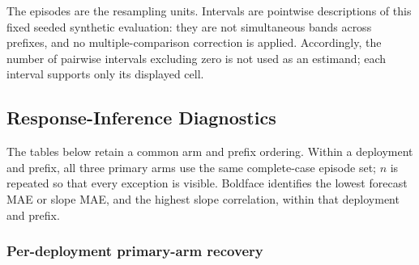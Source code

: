 The episodes are the resampling units. Intervals are pointwise descriptions of
this fixed seeded synthetic evaluation: they are not simultaneous bands across
prefixes, and no multiple-comparison correction is applied. Accordingly, the
number of pairwise intervals excluding zero is not used as an estimand; each
interval supports only its displayed cell.

\subsection{Response-Inference Diagnostics}
\label{app:coin-city-results}

The tables below retain a common arm and prefix ordering. Within a deployment and
prefix, all three primary arms use the same complete-case episode set; \(n\) is
repeated so that every exception is visible. Boldface identifies the lowest
forecast MAE or slope MAE, and the highest slope correlation, within that
deployment and prefix.

\subsubsection{Per-deployment primary-arm recovery}

